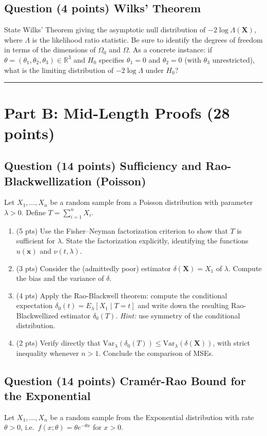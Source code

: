 \documentclass[11pt]{article}
\newcounter{qnum}
\newcommand{\question}[2]{\stepcounter{qnum}\subsection*{Question \theqnum \quad (#1 points) \hfill #2}}
\begin{document}
\question{4}{Wilks' Theorem}
State Wilks' Theorem giving the asymptotic null distribution of $-2\log\Lambda(\mathbf{X})$, where $\Lambda$ is the likelihood ratio statistic. Be sure to identify the degrees of freedom in terms of the dimensions of $\Omega_0$ and $\Omega$. As a concrete instance: if $\theta = (\theta_1,\theta_2,\theta_3) \in \mathbb{R}^3$ and $H_0$ specifies $\theta_1 = 0$ and $\theta_2 = 0$ (with $\theta_3$ unrestricted), what is the limiting distribution of $-2\log\Lambda$ under $H_0$?

\bigskip
\hrule
\bigskip

\section*{Part B: Mid-Length Proofs \hfill (28 points)}

\question{14}{Sufficiency and Rao-Blackwellization (Poisson)}
Let $X_1,\ldots,X_n$ be a random sample from a Poisson distribution with parameter $\lambda > 0$. Define $T = \sum_{i=1}^n X_i$.

\begin{enumerate}[label=(\alph*),leftmargin=2em]
    \item (5 pts) Use the Fisher--Neyman factorization criterion to show that $T$ is sufficient for $\lambda$. State the factorization explicitly, identifying the functions $u(\mathbf{x})$ and $\nu(t,\lambda)$.
    \item (3 pts) Consider the (admittedly poor) estimator $\delta(\mathbf{X}) = X_1$ of $\lambda$. Compute the bias and the variance of $\delta$.
    \item (4 pts) Apply the Rao-Blackwell theorem: compute the conditional expectation $\delta_0(t) = E_\lambda[X_1 \mid T = t]$ and write down the resulting Rao-Blackwellized estimator $\delta_0(T)$. \emph{Hint:} use symmetry of the conditional distribution.
    \item (2 pts) Verify directly that $\mathrm{Var}_\lambda(\delta_0(T)) \le \mathrm{Var}_\lambda(\delta(\mathbf{X}))$, with strict inequality whenever $n>1$. Conclude the comparison of MSEs.
\end{enumerate}

\question{14}{Cram\'er-Rao Bound for the Exponential}
Let $X_1,\ldots,X_n$ be a random sample from the Exponential distribution with rate $\theta > 0$, i.e.\ $f(x;\theta) = \theta e^{-\theta x}$ for $x > 0$.
\end{document}
